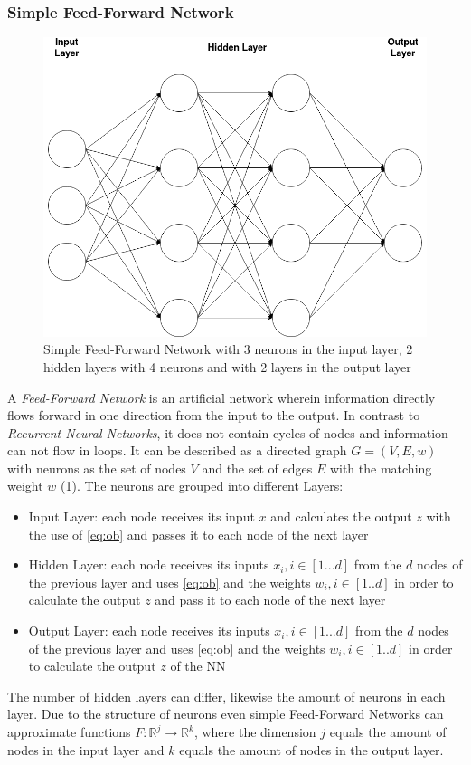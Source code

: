 \subsubsection{Simple Feed-Forward Network}
\begin{figure}
	\centering
	\includegraphics[width=0.55\linewidth]{figures/feedforward.png}
	\caption{Simple Feed-Forward Network with 3 neurons in the input layer, 2 hidden layers with 4 neurons and with 2 layers in the output layer}
	\label{fig:ffn}
\end{figure}
A \emph{Feed-Forward Network} is an artificial network wherein information directly flows forward in one direction from the input to the output. In contrast to \emph{Recurrent Neural Networks}, it does not contain cycles of nodes and information can not flow in loops. It can be described as a directed graph $G = (V,E,w)$ with neurons as the set of nodes $V$ and the set of edges $E$ with the matching weight $w$ (\cref{fig:ffn}). The neurons are grouped into different Layers:
\begin{itemize}
	\item Input Layer: each node receives its input $x$ and calculates the output $z$ with the use of \cref{eq:ob} and passes it to each node of the next layer
	\item Hidden Layer: each node receives its inputs $x_i, i \in [1...d]$ from the $d$ nodes of the previous layer and uses \cref{eq:ob} and the weights $w_i, i \in [1..d]$ in order to calculate the output $z$ and pass it to each node of the next layer
	\item Output Layer: each node receives its inputs $x_i, i \in [1...d]$ from the $d$ nodes of the previous layer and uses \cref{eq:ob} and the weights $w_i, i \in [1..d]$ in order to calculate the output $z$ of the NN
\end{itemize}
The number of hidden layers can differ, likewise the amount of neurons in each layer. Due to the structure of neurons even simple Feed-Forward Networks can approximate functions $F: \mathbb{R}^j \to \mathbb{R}^k$, where the dimension $j$ equals the amount of nodes in the input layer and $k$ equals the amount of nodes in the output layer.

